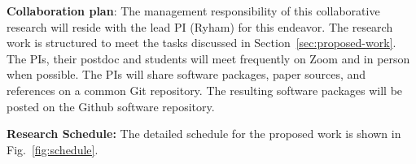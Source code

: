\medskip

\textbf{Collaboration plan}: 
%
The management responsibility of this collaborative research will reside
with the lead PI (Ryham) for this endeavor. The research work is
structured to meet the tasks discussed in
Section~\ref{sec:proposed-work}.
%
The PIs, their postdoc and students will meet frequently on Zoom and in
person when possible. The PIs will share software packages, paper
sources, and references on a common \textsf{Git} repository. The
resulting software packages will be posted on the \textsf{Github}
software repository.

\medskip

\textbf{Research Schedule:} The detailed schedule for the proposed work
is shown in Fig.~\ref{fig:schedule}.


